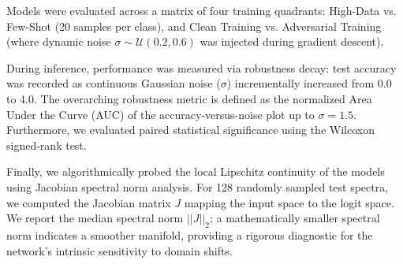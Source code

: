 Models were evaluated across a matrix of four training quadrants: High-Data vs. Few-Shot (20 samples per class), and Clean Training vs. Adversarial Training (where dynamic noise $\sigma \sim \mathcal{U}(0.2, 0.6)$ was injected during gradient descent).

During inference, performance was measured via robustness decay: test accuracy was recorded as continuous Gaussian noise ($\sigma$) incrementally increased from $0.0$ to $4.0$. The overarching robustness metric is defined as the normalized Area Under the Curve (AUC) of the accuracy-versus-noise plot up to $\sigma=1.5$. Furthermore, we evaluated paired statistical significance using the Wilcoxon signed-rank test.

Finally, we algorithmically probed the local Lipschitz continuity of the models using Jacobian spectral norm analysis. For 128 randomly sampled test spectra, we computed the Jacobian matrix $J$ mapping the input space to the logit space. We report the median spectral norm $||J||_2$; a mathematically smaller spectral norm indicates a smoother manifold, providing a rigorous diagnostic for the network's intrinsic sensitivity to domain shifts.